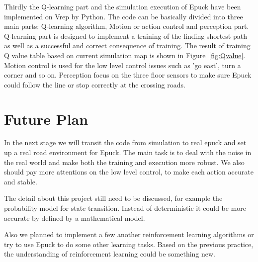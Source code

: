 \documentclass[a4paper, 11pt]{article} %
\begin{document}
Thirdly the Q-learning part and the simulation execution of Epuck have been implemented on Vrep by Python. The code can be basically divided into three main parts: Q-learning algorithm, Motion or action control and perception part. Q-learning part is designed to implement a training of the finding shortest path as well as a successful and correct consequence of training. The result of training Q value table based on current simulation map is shown in Figure~\ref{fig:Qvalue}. Motion control is used for the low level control issues such as 'go east', turn a corner and so on. Perception focus on the three floor sensors to make sure Epuck could follow the line or stop correctly at the crossing roads. 

\section{Future Plan}
In the next stage we will transit the code from simulation to real epuck and set up a real road environment for Epuck. The main task is to deal with the noise in the real world and make both the training and execution more robust. We also should pay more attentions on the low level control, to make each action accurate and stable.


The detail about this project still need to be discussed, for example the probability model for state transition. Instead of deterministic it could be more accurate by defined by a mathematical model.

Also we planned to implement a few another reinforcement learning algorithms or try to use Epuck to do some other learning tasks. Based on the previous practice, the understanding of reinforcement learning could be something new.
\end{document}

